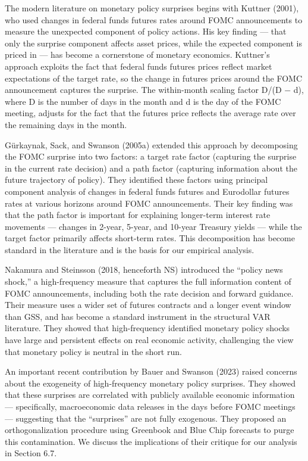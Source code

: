 \documentclass[
]{article}
\begin{document}
The modern literature on monetary policy surprises begins with Kuttner
(2001), who used changes in federal funds futures rates around FOMC
announcements to measure the unexpected component of policy actions. His
key finding --- that only the surprise component affects asset prices,
while the expected component is priced in --- has become a cornerstone
of monetary economics. Kuttner's approach exploits the fact that federal
funds futures prices reflect market expectations of the target rate, so
the change in futures prices around the FOMC announcement captures the
surprise. The within-month scaling factor D/(D − d), where D is the
number of days in the month and d is the day of the FOMC meeting,
adjusts for the fact that the futures price reflects the average rate
over the remaining days in the month.

Gürkaynak, Sack, and Swanson (2005a) extended this approach by
decomposing the FOMC surprise into two factors: a target rate factor
(capturing the surprise in the current rate decision) and a path factor
(capturing information about the future trajectory of policy). They
identified these factors using principal component analysis of changes
in federal funds futures and Eurodollar futures rates at various
horizons around FOMC announcements. Their key finding was that the path
factor is important for explaining longer-term interest rate movements
--- changes in 2-year, 5-year, and 10-year Treasury yields --- while the
target factor primarily affects short-term rates. This decomposition has
become standard in the literature and is the basis for our empirical
analysis.

Nakamura and Steinsson (2018, henceforth NS) introduced the ``policy
news shock,'' a high-frequency measure that captures the full
information content of FOMC announcements, including both the rate
decision and forward guidance. Their measure uses a wider set of futures
contracts and a longer event window than GSS, and has become a standard
instrument in the structural VAR literature. They showed that
high-frequency identified monetary policy shocks have large and
persistent effects on real economic activity, challenging the view that
monetary policy is neutral in the short run.

An important recent contribution by Bauer and Swanson (2023) raised
concerns about the exogeneity of high-frequency monetary policy
surprises. They showed that these surprises are correlated with publicly
available economic information --- specifically, macroeconomic data
releases in the days before FOMC meetings --- suggesting that the
``surprises'' are not fully exogenous. They proposed an
orthogonalization procedure using Greenbook and Blue Chip forecasts to
purge this contamination. We discuss the implications of their critique
for our analysis in Section 6.7.
\end{document}
